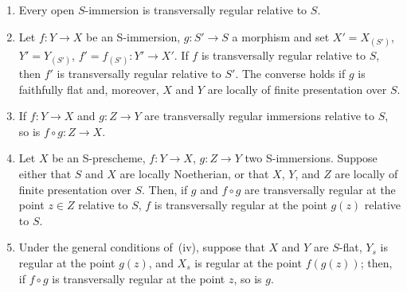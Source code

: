 \begin{proposition}[19.2.7]
\label{IV.19.2.7}
\medskip\noindent
\begin{enumerate}[label=(\roman*)]
  \item Every open $S$-immersion is transversally regular relative to $S$.
  \item Let $f:Y\to X$ be an S-immersion, $g:S'\to S$ a morphism and set $X'=X_{(S')}$, $Y'=Y_{(S')}$, $f'=f_{(S')}:Y'\to X'$.
If $f$ is transversally regular relative to $S$, then $f'$ is transversally regular relative to $S'$. The converse holds if $g$ is faithfully flat and, moreover, $X$ and $Y$ are locally of finite presentation over $S$.
  \item If $f:Y\to X$ and $g:Z\to Y$ are transversally regular immersions relative to $S$, so is $f\circ g:Z\to X$.
  \item Let $X$ be an S-prescheme, $f:Y\to X$, $g:Z\to Y$ two S-immersions.
Suppose either that $S$ and $X$ are locally Noetherian, or that $X$, $Y$, and $Z$ are locally of finite presentation over $S$.
Then, if $g$ and $f\circ g$ are transversally regular at the point $z\in Z$ relative to $S$, $f$ is transversally regular at the point $g(z)$ relative to $S$.
  \item Under the general conditions of~(iv), suppose that $X$ and $Y$ are $S$-flat, $Y_s$ is regular at the point $g(z)$, and $X_s$ is regular at the point $f(g(z))$; then, if $f\circ g$ is transversally regular at the point $z$, so is $g$.
\end{enumerate}
\end{proposition}

